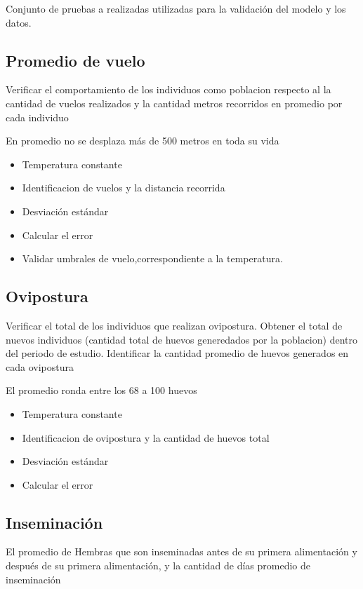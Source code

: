 Conjunto de pruebas a realizadas utilizadas para la validación del modelo y los datos.




\subsection{Promedio de vuelo}
Verificar el comportamiento de los individuos como poblacion respecto al 
la cantidad de vuelos realizados y la cantidad metros recorridos en promedio por cada individuo

En promedio no se desplaza más de 500 metros en toda su vida

\begin{itemize}
    \item Temperatura constante 
    \item Identificacion de vuelos y la distancia recorrida
    \item Desviación estándar
    \item Calcular el error
    \item Validar umbrales de vuelo,correspondiente a la temperatura.
\end{itemize}

\subsection{Ovipostura}
Verificar el total de los individuos que realizan ovipostura. Obtener el total de
nuevos individuos (cantidad total de huevos generedados por la poblacion) dentro 
del periodo de estudio. Identificar la cantidad promedio de huevos generados en cada ovipostura

El promedio ronda entre los 68 a 100 huevos

\begin{itemize}
    \item Temperatura constante 
    \item Identificacion de ovipostura y la cantidad de huevos total
    \item Desviación estándar
    \item Calcular el error
\end{itemize}


\subsection{Inseminación}
El promedio de Hembras que son inseminadas antes de su primera alimentación y después de su primera
alimentación, y la cantidad de días promedio de inseminación
 
